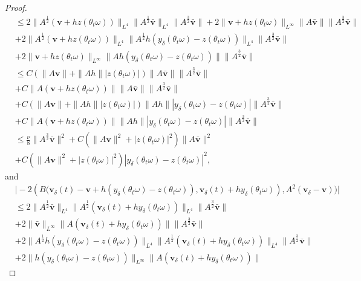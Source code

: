 \documentclass{elsarticle}
\theoremstyle{definition}
\numberwithin{equation}{section}
\begin{document}
\begin{proof}
\begin{align}
 &\leq 2\|A^\frac12(\textbf{v}+hz(\theta_t\omega))\|_{L^4}\|A^\frac12\bar{\textbf{v}}\|_{L^4}\|A^\frac32\bar{\textbf{v}}\|
 +2\|\textbf{v}+hz(\theta_t\omega)\|_{L^\infty}\|A\bar{\textbf{v}}\|\|A^\frac32\bar{\textbf{v}}\|\nonumber\\
 &+2\|A^\frac12(\textbf{v}+hz(\theta_t\omega))\|_{L^4}\|A^\frac12h(y_\delta(\theta_t\omega)-z(\theta_t\omega))
 \|_{L^4}\|A^\frac32\bar{\textbf{v}}\|\nonumber\\
 &+2\|\textbf{v}+hz(\theta_t\omega)\|_{L^\infty}\|Ah(y_\delta(\theta_t\omega)-z(\theta_t\omega))\|\|A^\frac32\bar{\textbf{v}}\|
 \nonumber\\
 &\leq C(\|A\textbf{v}\|+\|Ah\||z(\theta_t\omega)|)\|A\bar{\textbf{v}}\|\|A^\frac32\bar{\textbf{v}}\|\nonumber\\
 &+C\|A(\textbf{v}+hz(\theta_t\omega))\|\|A\bar{\textbf{v}}\|\|A^\frac32\bar{\textbf{v}}\|\nonumber\\
 &+C(\|A\textbf{v}\|+\|Ah\||z(\theta_t\omega)|)\|Ah\||y_\delta(\theta_t\omega)-z(\theta_t\omega)|
 \|A^\frac32\bar{\textbf{v}}\|\nonumber\\
 &+C\|A(\textbf{v}+hz(\theta_t\omega))\|\|Ah\||y_\delta(\theta_t\omega)-z(\theta_t\omega)|\|A^\frac32\bar{\textbf{v}}\|\nonumber\\
 &\leq \frac{\nu}{8}\|A^\frac32\bar{\textbf{v}}\|^2+C(\|A\textbf{v}\|^2+|z(\theta_t\omega)|^2)\|A\bar{\textbf{v}}\|^2\nonumber\\
 &+C(\|A\textbf{v}\|^2+|z(\theta_t\omega)|^2)|y_\delta(\theta_t\omega)-z(\theta_t\omega)|^2,
\end{align}
and 
\begin{align}\label{9.3}
&\big| -2(B\big( \textbf{v}_\delta(t)-\textbf{v}+h(y_\delta(\theta_t\omega)-z(\theta_t\omega)),\textbf{v}_\delta(t)+hy_\delta(\theta_t\omega))
,A^2(\textbf{v}_\delta-\textbf{v})\big)\big|\nonumber\\
&\leq 2\|A^\frac12\bar{\textbf{v}}\|_{L^4}\|A^\frac12(\textbf{v}_\delta(t)+hy_\delta(\theta_t\omega))\|_{L^4}
\|A^\frac32\bar{\textbf{v}}\|\nonumber\\
&+2\|\bar{\textbf{v}}\|_{L^\infty}\|A(\textbf{v}_\delta(t)+hy_\delta(\theta_t\omega))\|
\|A^\frac32\bar{\textbf{v}}\|\nonumber\\
&+2\|A^\frac12h(y_\delta(\theta_t\omega)-z(\theta_t\omega))\|_{L^4}\|A^\frac12(\textbf{v}_\delta(t)+hy_\delta(\theta_t\omega))\|_{L^4}
\|A^\frac32\bar{\textbf{v}}\|\nonumber\\
&+2\|h(y_\delta(\theta_t\omega)-z(\theta_t\omega))\|_{L^\infty}\|A(\textbf{v}_\delta(t)+hy_\delta(\theta_t\omega))\|

\end{align}
\end{proof}
\end{document}

